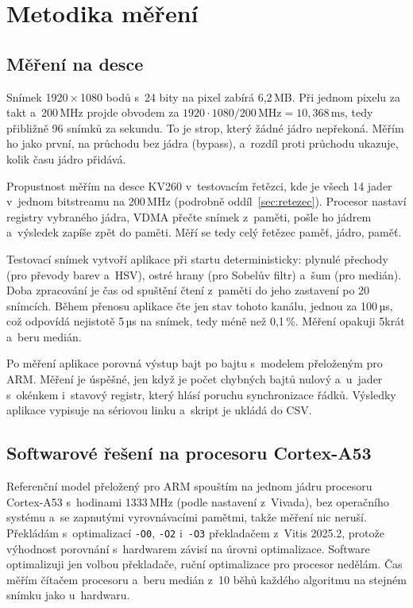 \section{Metodika měření}
\label{sec:metodika-mereni}

\subsection{Měření na desce}
\label{sec:deska}

Snímek 1920\,×\,1080 bodů s~24 bity na pixel zabírá 6,2\,MB. Při jednom pixelu za takt a~200\,MHz projde obvodem za $1920 \cdot 1080 / 200\,\mathrm{MHz} = 10{,}368\,\mathrm{ms}$, tedy přibližně 96 snímků za sekundu. To je strop, který žádné jádro nepřekoná. Měřím ho jako první, na průchodu bez jádra (bypass), a~rozdíl proti průchodu ukazuje, kolik času jádro přidává.

Propustnost měřím na desce KV260 v~testovacím řetězci, kde je všech 14 jader v~jednom bitstreamu na 200\,MHz (podrobně oddíl~\ref{sec:retezec}). Procesor nastaví registry vybraného jádra, \ac{VDMA} přečte snímek z~paměti, pošle ho jádrem a~výsledek zapíše zpět do paměti. Měří se tedy celý řetězec paměť, jádro, paměť.

Testovací snímek vytvoří aplikace při startu deterministicky: plynulé přechody (pro převody barev a~HSV), ostré hrany (pro Sobelův filtr) a~šum (pro medián). Doba zpracování je čas od spuštění čtení z~paměti do jeho zastavení po 20 snímcích. Během přenosu aplikace čte jen stav tohoto kanálu, jednou za 100\,µs, což odpovídá nejistotě 5\,µs na snímek, tedy méně než 0,1\,\%. Měření opakuji 5krát a~beru medián.

Po měření aplikace porovná výstup bajt po bajtu s~modelem přeloženým pro ARM. Měření je úspěšné, jen když je počet chybných bajtů nulový a~u~jader s~okénkem i~stavový registr, který hlásí poruchu synchronizace řádků. Výsledky aplikace vypisuje na sériovou linku a~skript je ukládá do CSV.

\subsection{Softwarové řešení na procesoru Cortex-A53}
\label{sec:sw}

Referenční model přeložený pro ARM spouštím na jednom jádru procesoru Cortex-A53 s~hodinami 1333\,MHz (podle nastavení z~Vivada), bez operačního systému a~se zapnutými vyrovnávacími pamětmi, takže měření nic neruší. Překládám s~optimalizací \texttt{-O0}, \texttt{-O2} i~\texttt{-O3} překladačem z~Vitis 2025.2, protože výhodnost porovnání s~hardwarem závisí na úrovni optimalizace. Software optimalizuji jen volbou překladače, ruční optimalizace pro procesor nedělám. Čas měřím čítačem procesoru a~beru medián z~10 běhů každého algoritmu na stejném snímku jako u~hardwaru.
